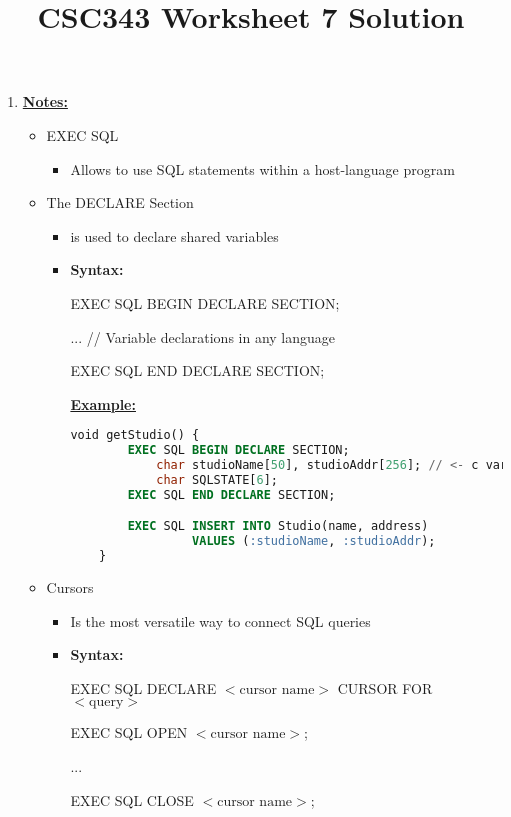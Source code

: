 \documentclass[12pt]{article}
\begin{document}
\title{CSC343 Worksheet 7 Solution}
\maketitle

\bigskip

\begin{enumerate}[1.]
    \item

    \bigskip

    \underline{\textbf{Notes:}}

    \bigskip

    \begin{itemize}
        \item EXEC SQL
        \begin{itemize}
            \item Allows to use SQL statements within a host-language program
        \end{itemize}
        \item The DECLARE Section
        \begin{itemize}
            \item is used to declare shared variables
            \item \textbf{Syntax:}

            EXEC SQL BEGIN DECLARE SECTION;

            ... // Variable declarations in any language

            EXEC SQL END DECLARE SECTION;

            \bigskip

            \underline{\textbf{Example:}}

            \bigskip

    \begin{lstlisting}[language=SQL]
    void getStudio() {
        EXEC SQL BEGIN DECLARE SECTION;
            char studioName[50], studioAddr[256]; // <- c variables
            char SQLSTATE[6];
        EXEC SQL END DECLARE SECTION;

        EXEC SQL INSERT INTO Studio(name, address)
                 VALUES (:studioName, :studioAddr);
    }
    \end{lstlisting}
        \end{itemize}

        \item Cursors
        \begin{itemize}
            \item Is the most versatile way to connect SQL queries
            \item \textbf{Syntax:}

            EXEC SQL DECLARE $<\text{cursor name}>$ CURSOR FOR $<\text{query}>$

            \bigskip

            EXEC SQL OPEN $<\text{cursor name}>$;

            ...

            EXEC SQL CLOSE $<\text{cursor name}>$;
        \end{itemize}
    \end{itemize}
\end{enumerate}
\end{document}
